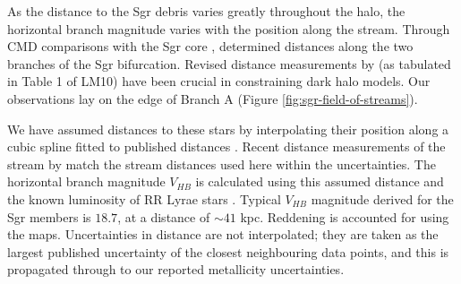 \documentclass[preprint2]{aastex}
\begin{document}

As the distance to the Sgr debris varies greatly throughout the halo, the horizontal branch magnitude varies with the position along the stream. 
Through CMD comparisons with the Sgr core \citep{Bellazzini;et-al_2006}, \citet{Belokurov;et-al_2006} determined distances along the two branches of the Sgr bifurcation.  Revised distance measurements by \citet{Siegel;et-al_2007} (as tabulated in Table 1 of LM10) have been crucial in constraining dark halo models. Our observations lay on the edge of Branch A (Figure \ref{fig:sgr-field-of-streams}).

We have assumed distances to these stars by interpolating their position along a cubic spline fitted to published distances \citep{Siegel;et-al_2007}. Recent distance measurements of the stream by \citet{Ruhland;et-al_2011} match the stream distances used here within the uncertainties. The horizontal branch magnitude $V_{HB}$ is calculated using this assumed distance and the known luminosity of RR Lyrae stars \citep[$M_V = +0.69;$][]{Tsujimoto;et-al_1998}. Typical $V_{HB}$ magnitude derived for the Sgr members is $18.7$, at a distance of $\sim{}41$ kpc. Reddening is accounted for using the \citet{Schlegel;Finkbeiner;Davis_1998} maps. Uncertainties in distance are not interpolated; they are taken as the largest published uncertainty of the closest neighbouring data points, and this is propagated through to our reported metallicity uncertainties. 
\end{document}
